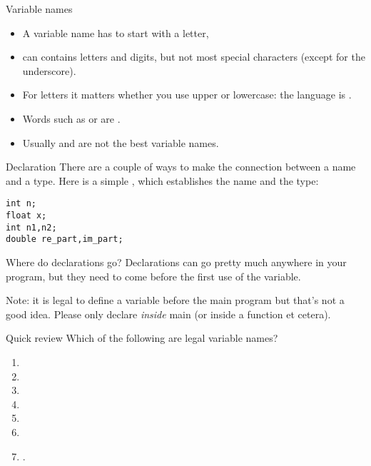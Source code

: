 \begin{block}{Variable names}
  \label{sl:varname}
  \begin{itemize}
  \item
    A variable name has to start with a letter,
  \item can contains letters and  digits, but not most
    special characters (except for the underscore).
  \item For letters it matters
    whether you use upper or lowercase: the language is .
  \item Words such as  or  are .
  \item Usually  and  are not the best variable names.
  \end{itemize}
\end{block}

\begin{block}{Declaration}
  \label{sl:declare-example}
  There are a couple of ways to make the connection between a name and a
  type. Here is a simple
  , which establishes the name
  and the type:
\begin{lstlisting}
int n;
float x;
int n1,n2;
double re_part,im_part;
\end{lstlisting}
\end{block}

\begin{block}{Where do declarations go?}
  \label{sl:declwhere}
  Declarations can go pretty much anywhere in your program, but they need
  to come before the first use of the variable.

  Note: it is legal to define a variable before the main program
  but that's not a good idea. Please only declare \emph{inside} main
  (or inside a function et cetera).
\end{block}

\begin{exercise}{Quick review}
  \label{q:varnames}
  Which of the following are legal variable names?
  \begin{enumerate}
  \item {} \item {} \item {}
  \item {} \item {} \item {} \item {}.
  \end{enumerate}
\end{exercise}

